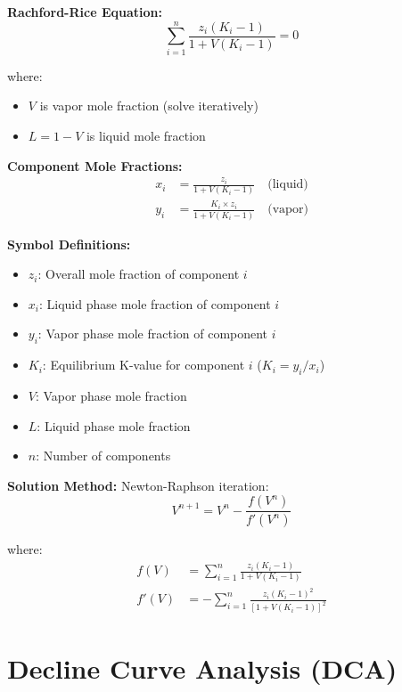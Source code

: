 \documentclass[11pt,a4paper]{article}
\newcommand{\symitem}[2]{\item \textbf{#1}: #2}
\begin{document}
\begin{tcolorbox}[colback=formulabox,colframe=black!75]
\textbf{Rachford-Rice Equation:}
\begin{equation}
\sum_{i=1}^{n} \frac{z_i (K_i - 1)}{1 + V(K_i - 1)} = 0
\end{equation}

where:
\begin{itemize}
\item $V$ is vapor mole fraction (solve iteratively)
\item $L = 1 - V$ is liquid mole fraction
\end{itemize}

\textbf{Component Mole Fractions:}
\begin{align}
x_i &= \frac{z_i}{1 + V(K_i - 1)} \quad \text{(liquid)} \\
y_i &= \frac{K_i \times z_i}{1 + V(K_i - 1)} \quad \text{(vapor)}
\end{align}
\end{tcolorbox}

\textbf{Symbol Definitions:}
\begin{itemize}[leftmargin=2cm]
\symitem{$z_i$}{Overall mole fraction of component $i$}
\symitem{$x_i$}{Liquid phase mole fraction of component $i$}
\symitem{$y_i$}{Vapor phase mole fraction of component $i$}
\symitem{$K_i$}{Equilibrium K-value for component $i$ ($K_i = y_i/x_i$)}
\symitem{$V$}{Vapor phase mole fraction}
\symitem{$L$}{Liquid phase mole fraction}
\symitem{$n$}{Number of components}
\end{itemize}

\textbf{Solution Method:}
Newton-Raphson iteration:
\begin{equation}
V^{n+1} = V^n - \frac{f(V^n)}{f'(V^n)}
\end{equation}

where:
\begin{align}
f(V) &= \sum_{i=1}^{n} \frac{z_i (K_i - 1)}{1 + V(K_i - 1)} \\
f'(V) &= -\sum_{i=1}^{n} \frac{z_i (K_i - 1)^2}{[1 + V(K_i - 1)]^2}
\end{align}

\newpage

\section{Decline Curve Analysis (DCA)}
\end{document}
